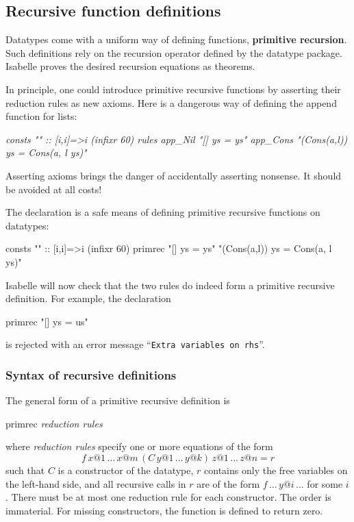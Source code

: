 

\subsection{Recursive function definitions}\label{sec:ZF:recursive}

Datatypes come with a uniform way of defining functions, {\bf primitive
  recursion}.  Such definitions rely on the recursion operator defined by the
datatype package.  Isabelle proves the desired recursion equations as
theorems.

In principle, one could introduce primitive recursive functions by asserting
their reduction rules as new axioms.  Here is a dangerous way of defining the
append function for lists:
\begin{ttbox}\slshape
consts  "\at" :: [i,i]=>i                        (infixr 60)
rules 
   app_Nil   "[] \at ys = ys"
   app_Cons  "(Cons(a,l)) \at ys = Cons(a, l \at ys)"
\end{ttbox}
Asserting axioms brings the danger of accidentally asserting nonsense.  It
should be avoided at all costs!

The  declaration is a safe means of defining primitive
recursive functions on datatypes:
\begin{ttbox}
consts  "\at" :: [i,i]=>i                        (infixr 60)
primrec 
   "[] \at ys = ys"
   "(Cons(a,l)) \at ys = Cons(a, l \at ys)"
\end{ttbox}
Isabelle will now check that the two rules do indeed form a primitive
recursive definition.  For example, the declaration
\begin{ttbox}
primrec
   "[] \at ys = us"
\end{ttbox}
is rejected with an error message ``\texttt{Extra variables on rhs}''.


\subsubsection{Syntax of recursive definitions}

The general form of a primitive recursive definition is
\begin{ttbox}
primrec
    {\it reduction rules}
\end{ttbox}
where \textit{reduction rules} specify one or more equations of the form
\[ f \, x@1 \, \dots \, x@m \, (C \, y@1 \, \dots \, y@k) \, z@1 \,
\dots \, z@n = r \] such that $C$ is a constructor of the datatype, $r$
contains only the free variables on the left-hand side, and all recursive
calls in $r$ are of the form $f \, \dots \, y@i \, \dots$ for some $i$.  
There must be at most one reduction rule for each constructor.  The order is
immaterial.  For missing constructors, the function is defined to return zero.


